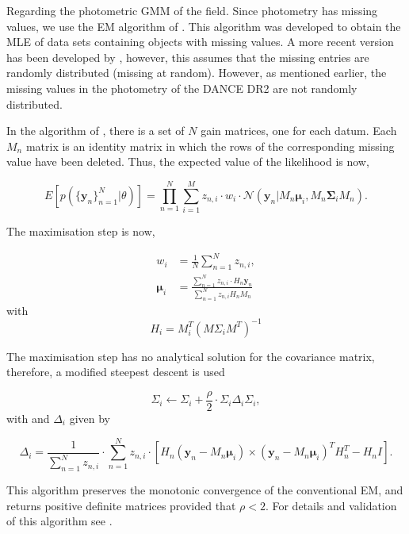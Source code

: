 Regarding the photometric GMM of the field. Since photometry has missing values, we use the EM algorithm of \citet{McMichael1996}. This algorithm was developed to obtain the MLE of data sets containing objects with missing values. A more recent version has been developed by \citet{Lin2006}, however, this assumes that the missing entries are randomly distributed (missing at random). However,  as mentioned earlier, the missing values in the photometry of the DANCE DR2 are not randomly distributed.

In the algorithm of \citet{McMichael1996}, there is a set of $N$ gain matrices, one for each datum. Each $M_n$ matrix is an identity matrix in which the rows of the corresponding missing value have been deleted. Thus, the expected value of the likelihood is now,

\begin{equation}
E[p(\{\mathbf{y}_n\}_{n=1}^N|\theta)]=\prod_{n=1}^N {\sum_{i=1} ^M {z_{n,i}\cdot w_i\cdot \mathcal{N}(\mathbf{y}_n|M_n \boldsymbol{\mu}_i,M_n\boldsymbol{\Sigma}_i M_n)}}.
\end{equation}

The maximisation step is now,

\begin{align}
w_i &= \frac{1}{N} \sum_{n=1}^N z_{n,i}, \\
\boldsymbol{\mu}_i &= \frac{ \sum_{n=1}^N z_{n,i}\cdot H_n \mathbf{y}_n}{\sum_{n=1}^N z_{n,i} H_n M_n}
\end{align}
with 
\begin{equation}
H_i=M_i^T(M\Sigma_i M^T)^{-1}
\end{equation}

The maximisation step has no analytical solution for the covariance matrix, therefore, a modified steepest descent is used

\begin{equation}
\Sigma_i \leftarrow \Sigma_i + \frac{\rho}{2}\cdot \Sigma_i\Delta_i\Sigma_i,
\end{equation}
with  and $\Delta_i$ given by

\begin{equation}
\Delta_i=  \frac{1}{\sum_{n=1}^N z_{n,i}}\cdot \sum_{n=1}^N z_{n,i} \cdot \left[H_n(\mathbf{y}_n -  M_n \boldsymbol{\mu}_i) \times  (\mathbf{y}_n -  M_n \boldsymbol{\mu}_i)^TH_n^T - H_nI\right].
\end{equation}
 
 This algorithm preserves the monotonic convergence of the conventional EM, and returns positive definite matrices provided that $\rho < 2$. For details and validation of this algorithm see \citet{McMichael1996}.

